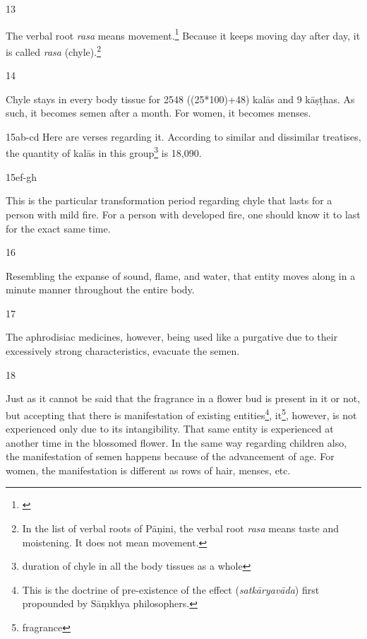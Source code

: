 \begin{translation}
\item[13]

The verbal root \emph{rasa} means movement.\footnote{\cite[109]{kunj-1907}} Because it keeps moving day after day, it is called \emph{rasa} (chyle).\footnote{In the list of verbal roots of Pāṇini, the verbal root \emph{rasa} means taste and moistening. It does not mean movement.}    

\item[14]

Chyle stays in every body tissue for 2548 ((25*100)+48) kalās and 9 kāṣṭhas. As such, it becomes semen after a month. For women, it becomes menses.  

\item[15ab-cd] Here are verses regarding it.
According to similar and dissimilar treatises, the quantity of kalās in this group\footnote{duration of chyle in all the body tissues as a whole} is 18,090.

\item[15ef-gh]

This is the particular transformation period regarding chyle that lasts for a person with mild fire. For a person with developed fire, one should know it to last for the exact same time.




\item[16]

Resembling the expanse of sound, flame, and water, that entity moves along in a minute manner throughout the  entire body.

\item[17]

The aphrodisiac medicines, however, being used like a purgative due to their excessively strong characteristics, evacuate the semen.      

\item[18]

Just as it cannot be said that the fragrance in a flower bud is present in it or not, but accepting that there is manifestation of existing entities\footnote{This is the doctrine of pre-existence of the effect (\textit{satkāryavāda}) first propounded by Sāṃkhya philosophers.}, it\footnote{fragrance}, however, is not experienced only due to its intangibility. That same entity is experienced at another time in the blossomed flower. In the same way regarding children also, the manifestation of semen happens because of the advancement of age. For women, the manifestation is different as rows of hair, menses, etc. 


\end{translation}
